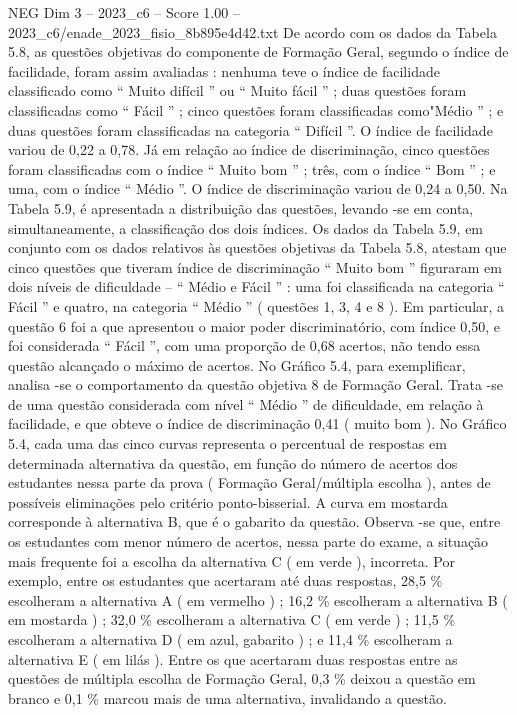 \begin{textsample}{NEG Dim 3 – 2023\_c6 – Score 1.00 – 2023\_c6/enade\_2023\_fisio\_8b895e4d42.txt}
De acordo com os dados da Tabela 5.8, as questões objetivas do componente de Formação Geral, segundo o índice de facilidade, foram assim avaliadas : nenhuma teve o índice de facilidade classificado como “ Muito difícil ” ou “ Muito fácil ” ; duas questões foram classificadas como “ Fácil ” ; cinco questões foram classificadas como"Médio ” ; e duas questões foram classificadas na categoria “ Difícil ”.
O índice de facilidade variou de 0,22 a 0,78.
Já em relação ao índice de discriminação, cinco questões foram classificadas com o índice “ Muito bom ” ; três, com o índice “ Bom ” ; e uma, com o índice “ Médio ”.
O índice de discriminação variou de 0,24 a 0,50.
Na Tabela 5.9, é apresentada a distribuição das questões, levando -se em conta, simultaneamente, a classificação dos dois índices.
Os dados da Tabela 5.9, em conjunto com os dados relativos às questões objetivas da Tabela 5.8, atestam que cinco questões que tiveram índice de discriminação “ Muito bom ” figuraram em dois níveis de dificuldade – “ Médio e Fácil ” : uma foi classificada na categoria “ Fácil ” e quatro, na categoria “ Médio ” ( questões 1, 3, 4 e 8 ).
Em particular, a questão 6 foi a que apresentou o maior poder discriminatório, com índice 0,50, e foi considerada “ Fácil ”, com uma proporção de 0,68 acertos, não tendo essa questão alcançado o máximo de acertos.
No Gráfico 5.4, para exemplificar, analisa -se o comportamento da questão objetiva 8 de Formação Geral.
Trata -se de uma questão considerada com nível “ Médio ” de dificuldade, em relação à facilidade, e que obteve o índice de discriminação 0,41 ( muito bom ).
No Gráfico 5.4, cada uma das cinco curvas representa o percentual de respostas em determinada alternativa da questão, em função do número de acertos dos estudantes nessa parte da prova ( Formação Geral/múltipla escolha ), antes de possíveis eliminações pelo critério ponto-bisserial.
A curva em mostarda corresponde à alternativa B, que é o gabarito da questão.
Observa -se que, entre os estudantes com menor número de acertos, nessa parte do exame, a situação mais frequente foi a escolha da alternativa C ( em verde ), incorreta.
Por exemplo, entre os estudantes que acertaram até duas respostas, 28,5 \% escolheram a alternativa A ( em vermelho ) ; 16,2 \% escolheram a alternativa B ( em mostarda ) ; 32,0 \% escolheram a alternativa C ( em verde ) ; 11,5 \% escolheram a alternativa D ( em azul, gabarito ) ; e 11,4 \% escolheram a alternativa E ( em lilás ).
Entre os que acertaram duas respostas entre as questões de múltipla escolha de Formação Geral, 0,3 \% deixou a questão em branco e 0,1 \% marcou mais de uma alternativa, invalidando a questão.

\end{textsample}
